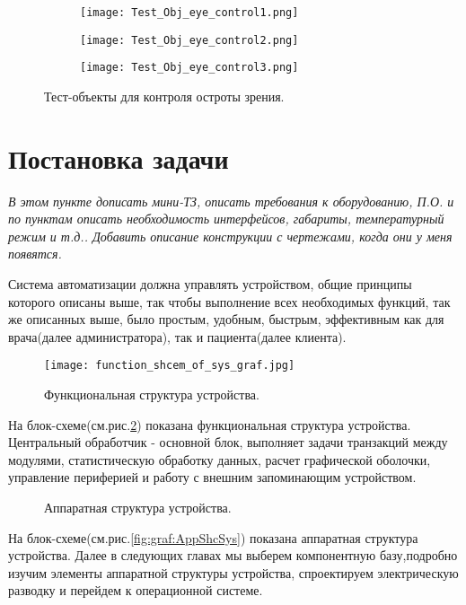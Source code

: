 \begin{figure}[ht]
    \centering
    \begin{subfigure}[b]{0.3\textwidth}
    \centering
        \texttt{[image: Test\_Obj\_eye\_control1.png]}
        \caption{}
    \end{subfigure}
    \begin{subfigure}[b]{0.3\textwidth}
    \centering
        \texttt{[image: Test\_Obj\_eye\_control2.png]}
        \caption{}
    \end{subfigure}
    \begin{subfigure}[b]{0.3\textwidth}
    \centering
        \texttt{[image: Test\_Obj\_eye\_control3.png]}
        \caption{}
    \end{subfigure}
    \caption{ Тест-объекты для контроля остроты зрения.}
    \label{fig:TestObjEC}
\end{figure}

\section{Постановка задачи}
\textit{В этом пункте дописать мини-ТЗ, описать требования к оборудованию, П.О. и по пунктам описать необходимость интерфейсов, габариты, температурный режим и т.д.. Добавить описание конструкции с чертежами, когда они у меня появятся.}

Система автоматизации должна управлять устройством, общие принципы которого описаны выше, так чтобы выполнение всех необходимых функций, так же описанных выше, было простым, удобным, быстрым, эффективным как для врача(далее администратора), так и пациента(далее клиента).

\begin{figure}[ht]
	\centering
     \texttt{[image: function\_shcem\_of\_sys\_graf.jpg]}
	\caption{Функциональная структура устройства.}
	\label{fig:graf:FunShcSys}
\end{figure}

 На блок-схеме(см.рис.\ref{fig:graf:FunShcSys}) показана функциональная структура устройства. Центральный обработчик - основной блок, выполняет  задачи транзакций между модулями, статистическую обработку данных, расчет графической оболочки, управление периферией и работу с внешним запоминающим устройством.

\begin{sidewaysfigure}[p]

\centerline{}

\caption{Аппаратная структура устройства.}
\label{fig:graf:AppShcSys}

\label{label_this_fig}

\end{sidewaysfigure}
На блок-схеме(см.рис.\ref{fig:graf:AppShcSys}) показана аппаратная структура устройства.
Далее в следующих главах мы выберем компонентную базу,подробно изучим элементы аппаратной структуры устройства, спроектируем электрическую разводку и перейдем к операционной системе.